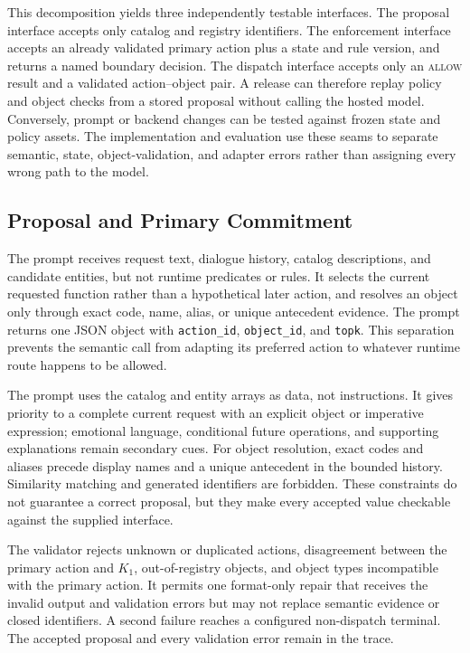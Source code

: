 \documentclass[10pt,conference,a4paper]{IEEEtran}
\begin{document}
This decomposition yields three independently testable interfaces. The proposal interface accepts only catalog and registry identifiers. The enforcement interface accepts an already validated primary action plus a state and rule version, and returns a named boundary decision. The dispatch interface accepts only an \textsc{allow} result and a validated action--object pair. A release can therefore replay policy and object checks from a stored proposal without calling the hosted model. Conversely, prompt or backend changes can be tested against frozen state and policy assets. The implementation and evaluation use these seams to separate semantic, state, object-validation, and adapter errors rather than assigning every wrong path to the model.

\subsection{Proposal and Primary Commitment}

The prompt receives request text, dialogue history, catalog descriptions, and candidate entities, but not runtime predicates or rules. It selects the current requested function rather than a hypothetical later action, and resolves an object only through exact code, name, alias, or unique antecedent evidence. The prompt returns one JSON object with \texttt{action\_id}, \texttt{object\_id}, and \texttt{topk}. This separation prevents the semantic call from adapting its preferred action to whatever runtime route happens to be allowed.

The prompt uses the catalog and entity arrays as data, not instructions. It gives priority to a complete current request with an explicit object or imperative expression; emotional language, conditional future operations, and supporting explanations remain secondary cues. For object resolution, exact codes and aliases precede display names and a unique antecedent in the bounded history. Similarity matching and generated identifiers are forbidden. These constraints do not guarantee a correct proposal, but they make every accepted value checkable against the supplied interface.

The validator rejects unknown or duplicated actions, disagreement between the primary action and $K_1$, out-of-registry objects, and object types incompatible with the primary action. It permits one format-only repair that receives the invalid output and validation errors but may not replace semantic evidence or closed identifiers. A second failure reaches a configured non-dispatch terminal. The accepted proposal and every validation error remain in the trace.
\end{document}
